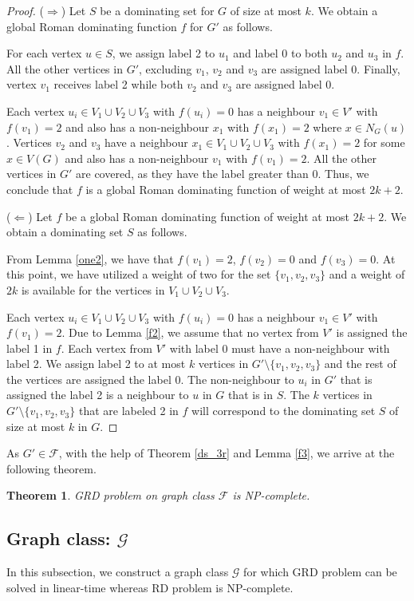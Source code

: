 \documentclass[preprint,12pt]{elsarticle}
\newtheorem{theorem}{Theorem}[section]
\begin{document}
\begin{proof}
\noindent($\Rightarrow$) Let $S$ be a dominating set for $G$ of size at most $k$. We obtain a global Roman dominating function $f$ for $G'$ as follows.

For each vertex $u \in S$, we assign label 2 to $u_1$ and label 0 to both $u_2$ and $u_3$ in $f$. All the other vertices in $G'$, excluding $v_1$, $v_2$ and $v_3$ are assigned label 0. Finally, vertex $v_1$ receives label 2 while both $v_2$ and $v_3$ are assigned label 0. 

Each vertex $u_i \in V_1 \cup V_2 \cup V_3$ with $f(u_i) = 0$ has a neighbour $v_1 \in V'$ with $f(v_1) = 2$ and also has a non-neighbour $x_1$ with $f(x_1) = 2$ where $x \in N_G(u)$. Vertices $v_2$ and $v_3$ have a neighbour $x_1 \in V_1 \cup V_2 \cup V_3$ with $f(x_1)=2$ for some $x \in V(G)$ and also has a non-neighbour $v_1$ with $f(v_1)=2$. All the other vertices in $G'$ are covered, as they have the label greater than 0. Thus, we conclude that $f$ is a global Roman dominating function of weight at most $2k+2$.

\noindent($\Leftarrow$) Let $f$ be a global Roman dominating function of weight at most $2k+2$. We obtain a dominating set $S$ as follows.

From Lemma \ref{one2}, we have that $f(v_1)=2$, $f(v_2)=0$ and $f(v_3) = 0$. At this point, we have utilized a weight of two for the set $\{v_1, v_2, v_3\}$ and a weight of $2k$ is available for the vertices in $V_1 \cup V_2 \cup V_3$.

Each vertex $u_i \in V_1 \cup V_2 \cup V_3$ with $f(u_i) = 0$ has a neighbour $v_1 \in V'$ with $f(v_1) = 2$. Due to Lemma \ref{f2}, we assume that no vertex from $V'$ is assigned the label 1 in $f$. Each vertex from $V'$ with label 0 must have a non-neighbour with label 2. We assign label 2 to at most $k$ vertices in $G' \setminus \{v_1, v_2, v_3\}$ and the rest of the vertices are assigned the label 0. The non-neighbour to $u_i$ in $G'$ that is assigned the label 2 is a neighbour to $u$ in $G$ that is in $S$. The $k$ vertices in $G' \setminus \{v_1, v_2, v_3\}$ that are labeled 2 in $f$ will correspond to the dominating set $S$ of size at most $k$ in $G$. 
\end{proof} 
As $G' \in \mathcal{F}$, with the help of Theorem \ref{ds_3r} and Lemma \ref{f3}, we arrive at the following theorem. 
\begin{theorem}
    GRD problem on graph class $\mathcal{F}$ is NP-complete.
\end{theorem}
\subsection{Graph class: $\mathcal{G}$}
In this subsection, we construct a graph class $\mathcal{G}$ for which GRD problem can be solved in linear-time whereas RD problem is NP-complete. 
\end{document}
